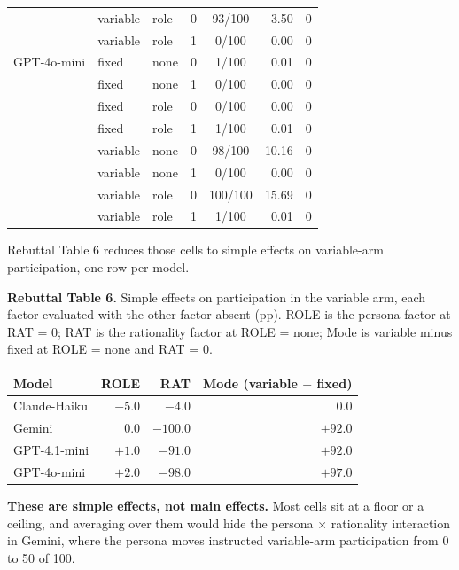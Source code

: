 {\begin{tabular}{lllccrc}
             & variable & role & 0 & 93/100 & 3.50 & 0 \\
             & variable & role & 1 & 0/100  & 0.00 & 0 \\
\addlinespace
GPT-4o-mini  & fixed    & none & 0 & 1/100  & 0.01 & 0 \\
             & fixed    & none & 1 & 0/100  & 0.00 & 0 \\
             & fixed    & role & 0 & 0/100  & 0.00 & 0 \\
             & fixed    & role & 1 & 1/100  & 0.01 & 0 \\
             & variable & none & 0 & 98/100 & 10.16 & 0 \\
             & variable & none & 1 & 0/100  & 0.00 & 0 \\
             & variable & role & 0 & 100/100 & 15.69 & 0 \\
             & variable & role & 1 & 1/100  & 0.01 & 0 \\
\bottomrule
\end{tabular}
}

\vspace{0.8em}
\noindent
Rebuttal Table 6 reduces those cells to simple effects on variable-arm participation, one row per
model.

\vspace{0.4em}
\noindent\textbf{Rebuttal Table 6.} Simple effects on participation in the variable arm, each factor evaluated with the other factor absent (pp). ROLE is the persona factor at RAT = 0; RAT is the rationality factor at ROLE = none; Mode is variable minus fixed at ROLE = none and RAT = 0.

\vspace{0.3em}
{\small
\begin{tabular}{lrrr}
\toprule
\textbf{Model} & \textbf{ROLE} & \textbf{RAT} & \textbf{Mode (variable $-$ fixed)} \\
\midrule
Claude-Haiku & $-5.0$ & $-4.0$ & $0.0$ \\
Gemini       & $0.0$  & $\mathbf{-100.0}$ & $\mathbf{+92.0}$ \\
GPT-4.1-mini & $+1.0$ & $\mathbf{-91.0}$  & $\mathbf{+92.0}$ \\
GPT-4o-mini  & $+2.0$ & $\mathbf{-98.0}$  & $\mathbf{+97.0}$ \\
\bottomrule
\end{tabular}
}

\vspace{0.8em}
\noindent\textbf{These are simple effects, not main effects.} Most cells sit at a floor or a
ceiling, and averaging over them would hide the persona $\times$ rationality interaction in
Gemini, where the persona moves instructed variable-arm participation from 0 to 50 of 100.

